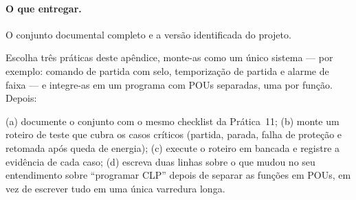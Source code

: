 \paragraph{O que entregar.} O conjunto documental completo e a versão identificada do projeto.

\begin{pratica}
Escolha três práticas deste apêndice, monte-as como um único sistema --- por exemplo: comando de
partida com selo, temporização de partida e alarme de faixa --- e integre-as em um programa com
POUs separadas, uma por função. Depois:

(a) documente o conjunto com o mesmo checklist da Prática~11;
(b) monte um roteiro de teste que cubra os casos críticos (partida, parada, falha de proteção e
retomada após queda de energia);
(c) execute o roteiro em bancada e registre a evidência de cada caso;
(d) escreva duas linhas sobre o que mudou no seu entendimento sobre ``programar CLP'' depois de
separar as funções em POUs, em vez de escrever tudo em uma única varredura longa.
\end{pratica}

